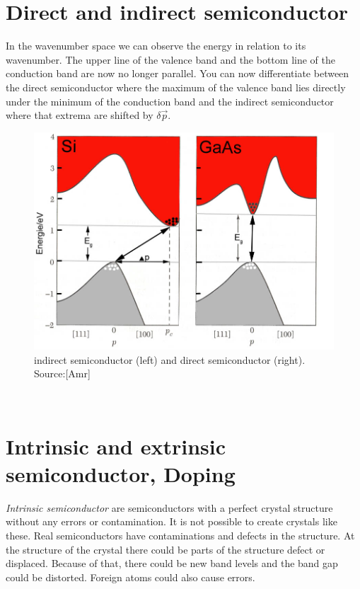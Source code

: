 \section{Direct and indirect semiconductor}
In the wavenumber space we can observe the energy in relation to its wavenumber. The upper line of the valence band and the bottom line of the conduction band are now no longer parallel. You can now differentiate between the direct semiconductor where the maximum of the valence band lies directly under the minimum of the conduction band and the indirect semiconductor where that extrema are shifted by  $\mathit{\delta\vec{p}}$.
\begin{figure}[h]
\begin{center}
\includegraphics[scale=0.3]{bilder/impulsraum}
\caption{indirect semiconductor (left) and direct semiconductor (right). Source:[Amr] }
\label{fig:impuls}
\end{center}
\end{figure}
\\
\section{Intrinsic and extrinsic semiconductor, Doping}
\textit{Intrinsic semiconductor} are semiconductors with a perfect crystal structure without any errors or contamination. It is not possible to create crystals like these. Real semiconductors have contaminations and defects in the structure. At the structure of the crystal there could be parts of the structure defect or displaced. Because of that, there could be new band levels and the band gap could be distorted. Foreign atoms could also cause errors.
